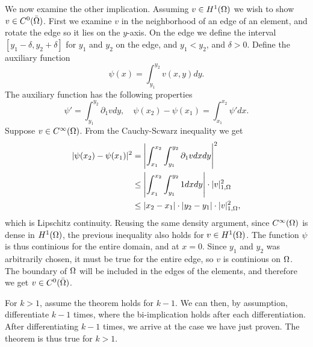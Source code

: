 \begin{bev}
    We now examine the other implication. 
    Assuming $v\in H^1(\Omega)$ we wish to show $v \in C^0(\bar{\Omega})$. 
    First we examine $v$ in the neighborhood of an edge of an element, and rotate the edge so it lies on the $y$-axis. 
    On the edge we define the interval $[y_1-\delta, y_2+\delta]$ for $y_1$ and $y_2$ on the edge, and $y_1<y_2$, and 
    $\delta > 0$.
    Define the auxiliary function
    \begin{equation}
        \psi (x) = \int_{y_1}^{y_2} v(x,y) dy.
    \end{equation}
    The auxiliary function has the following properties
    \begin{equation}
        \psi ' =\int_{y_1}^{y_2} \partial_1 v dy, \quad \psi(x_2) - \psi(x_1) =\int_{x_1}^{x_2} \psi ' dx.
    \end{equation}
    Suppose $v \in C^{\infty}(\Omega)$. From the Cauchy-Scwarz inequality we get
    \begin{align}
        |\psi(x_2) -\psi(x_1)|^2 &= \left| \int_{x_1}^{x_2} \int_{y_1}^{y_2} \partial_1 v dx dy \right|^2\\
        &\leq \left| \int_{x_1}^{x_2} \int_{y_1}^{y_2} 1 dx dy \right| \cdot | v |_{1, \Omega}^2\\
        &\leq |x_2 - x_1| \cdot |y_2 - y_1| \cdot | v |_{1, \Omega}^2,
    \end{align}
    which is Lipschitz continuity.
    Reusing the same density argument, since $C^\infty(\Omega)$ is dense in $H^1(\Omega)$, the previous inequality 
    also holds for $v\in H^1(\Omega)$.
    The function $\psi$ is thus continious for the entire domain, and at $x=0$. 
    Since $y_1$ and $y_2$ was arbitrarily chosen, it must be true for the entire edge,
    so $v$ is continious on $\Omega$. 
    The boundary of $\Omega$ will be included in the edges of the elements,
    and therefore we get $v\in C^0(\bar{\Omega})$.

    For $k>1$, assume the theorem holds for $k-1$. We can then, by assumption, differentiate 
    $k-1$ times, where the bi-implication holds after each differentiation. 
    After differentiating $k-1$ times, we arrive at the case we have just proven. 
    The theorem is thus true for $k>1$.
\end{bev}